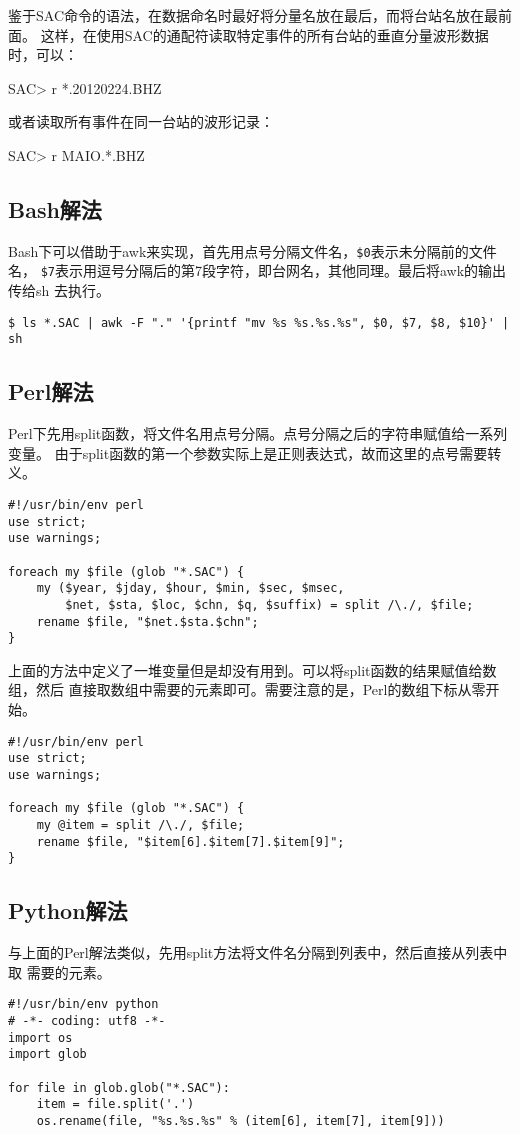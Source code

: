 鉴于SAC命令的语法，在数据命名时最好将分量名放在最后，而将台站名放在最前面。
这样，在使用SAC的通配符读取特定事件的所有台站的垂直分量波形数据时，可以：
\begin{SACCode}
SAC> r *.20120224.BHZ
\end{SACCode}
或者读取所有事件在同一台站的波形记录：
\begin{SACCode}
SAC> r MAIO.*.BHZ
\end{SACCode}

\subsection{Bash解法}
Bash下可以借助于awk来实现，首先用点号分隔文件名，\verb+$0+表示未分隔前的文件名，
\verb+$7+表示用逗号分隔后的第7段字符，即台网名，其他同理。最后将awk的输出传给sh
去执行。
\begin{verbatim}
$ ls *.SAC | awk -F "." '{printf "mv %s %s.%s.%s", $0, $7, $8, $10}' | sh
\end{verbatim}

\subsection{Perl解法}
Perl下先用split函数，将文件名用点号分隔。点号分隔之后的字符串赋值给一系列变量。
由于split函数的第一个参数实际上是正则表达式，故而这里的点号需要转义。
\begin{verbatim}
#!/usr/bin/env perl
use strict;
use warnings;

foreach my $file (glob "*.SAC") {
    my ($year, $jday, $hour, $min, $sec, $msec,
        $net, $sta, $loc, $chn, $q, $suffix) = split /\./, $file;
    rename $file, "$net.$sta.$chn";
}
\end{verbatim}

上面的方法中定义了一堆变量但是却没有用到。可以将split函数的结果赋值给数组，然后
直接取数组中需要的元素即可。需要注意的是，Perl的数组下标从零开始。
\begin{verbatim}
#!/usr/bin/env perl
use strict;
use warnings;

foreach my $file (glob "*.SAC") {
    my @item = split /\./, $file;
    rename $file, "$item[6].$item[7].$item[9]";
}
\end{verbatim}

\subsection{Python解法}
与上面的Perl解法类似，先用split方法将文件名分隔到列表中，然后直接从列表中取
需要的元素。
\begin{verbatim}
#!/usr/bin/env python
# -*- coding: utf8 -*-
import os
import glob

for file in glob.glob("*.SAC"):
    item = file.split('.')
    os.rename(file, "%s.%s.%s" % (item[6], item[7], item[9]))
\end{verbatim}
